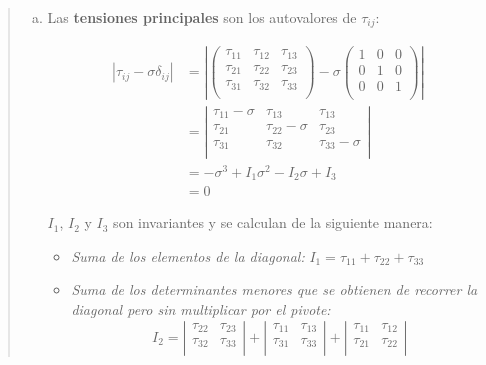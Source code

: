 \documentclass[a4paper,10pt,twoside,final,spanish]{article}
\begin{document}
\begin{quote}
\begin{enumerate}[a.]
\item 

Las \textbf{tensiones principales} son los autovalores de $\tau_{ij}$:

\begin{align*}
|\tau_{ij}-\sigma\delta_{ij}| 
&=
\left|\left(\begin{matrix}
\tau_{11} & \tau_{12} & \tau_{13} \\
\tau_{21} & \tau_{22} & \tau_{23} \\
\tau_{31} & \tau_{32} & \tau_{33} \\
\end{matrix}\right)-\sigma
\left(\begin{matrix}
1 & 0 & 0 \\
0 & 1 & 0 \\
0 & 0 & 1 \\
\end{matrix}\right)\right| \\
&=
\left|\begin{matrix}
\tau_{11}-\sigma & \tau_{13} & \tau_{13} \\
\tau_{21} & \tau_{22}-\sigma & \tau_{23} \\
\tau_{31} & \tau_{32} & \tau_{33}-\sigma \\
\end{matrix}\right| \\
&= 
-\sigma^{3}+I_{1}\sigma^{2}-I_{2}\sigma+I_{3} \\
&=
0
\end{align*}

$I_{1}$, $I_{2}$ y $I_{3}$ son invariantes y se calculan de la siguiente manera:

\begin{itemize}
\item \textit{Suma de los elementos de la diagonal: }$I_{1} = \tau_{11}+\tau_{22}+\tau_{33}$

\item \textit{Suma de los determinantes menores que se obtienen de recorrer la diagonal pero sin multiplicar por el pivote: }
\[
I_{2}=
\left|\begin{matrix}
\tau_{22} & \tau_{23} \\
\tau_{32} & \tau_{33} \\
\end{matrix}\right|
+
\left|\begin{matrix}
\tau_{11} & \tau_{13} \\
\tau_{31} & \tau_{33} \\
\end{matrix}\right|
+
\left|\begin{matrix}
\tau_{11} & \tau_{12} \\
\tau_{21} & \tau_{22} \\
\end{matrix}\right|
\]


\end{itemize}
\end{enumerate}
\end{quote}
\end{document}
